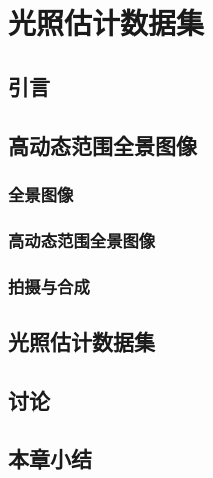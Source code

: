 \chapter{光照估计数据集}

\section{引言}
\section{高动态范围全景图像}
\subsection{全景图像}
\subsection{高动态范围全景图像}
\subsection{拍摄与合成}
\section{光照估计数据集}
\section{讨论}
\section{本章小结}